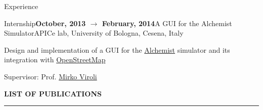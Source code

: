\documentclass{resume} %
\begin{document}
\begin{rSection}{Experience}
\begin{rSubsection}{Internship}{\textbf{October, 2013 $\rightarrow$ February, 2014}}{A GUI for the Alchemist Simulator}{APICe lab, University of Bologna, Cesena, Italy}
\item Design and implementation of a GUI for the \href{http://alchemistsimulator.github.io}{Alchemist} simulator and its integration with \href{https://www.openstreetmap.org}{OpenStreetMap}
\item Supervisor: Prof. \href{mailto:mirko.viroli@unibo.it}{Mirko Viroli}
\end{rSubsection}

\end{rSection}


%	
%	
%	
%	
%
%	
\MakeUppercase{\bf List of Publications} %
\sectionlineskip
\hrule %
\vspace{-1cm}
\nocite{*}

\renewcommand\refname{}

\end{document}
